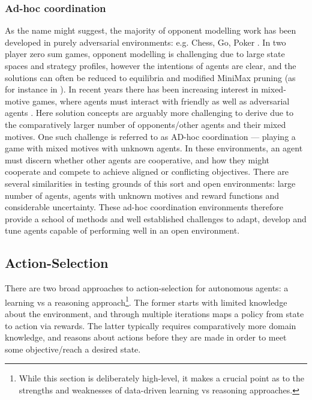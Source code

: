 \subsubsection{Ad-hoc coordination}
As the name might suggest, the majority of opponent modelling work has been developed in purely adversarial environments: e.g. Chess, Go, Poker \cite{Brown2017,Brown2020,AlphaGo}. In two player zero sum games, opponent modelling is challenging due to large state spaces and strategy profiles, however the intentions of agents are clear, and the solutions can often be reduced to equilibria and modified MiniMax pruning (as for instance in \cite{Brown2020}). 
\newline \newline
In recent years there has been increasing interest in mixed-motive games, where agents must interact with friendly as well as adversarial agents \cite{Barrett2017}. Here solution concepts are arguably more challenging to derive due to the comparatively larger number of opponents/other agents and their mixed motives. One such challenge is referred to as AD-hoc coordination --- playing a game with mixed motives with unknown agents. In these environments, an agent must discern whether other agents are cooperative, and how they might cooperate and compete to achieve aligned or conflicting objectives.
\newline \newline
There are several similarities in testing grounds of this sort and open environments: large number of agents, agents with unknown motives and reward functions and considerable uncertainty. These ad-hoc coordination environments therefore provide a school of methods and well established challenges to adapt, develop and tune agents capable of performing well in an open environment. 

\subsection{Action-Selection}
There are two broad approaches to action-selection for autonomous agents: a learning vs a reasoning approach\footnote{While this section is deliberately high-level, it makes a crucial point as to the strengths and weaknesses of data-driven learning vs reasoning approaches.}. The former starts with limited knowledge about the environment, and through multiple iterations maps a policy from state to action via rewards. The latter typically requires comparatively more domain knowledge, and reasons about actions before they are made in order to meet some objective/reach a desired state. 

